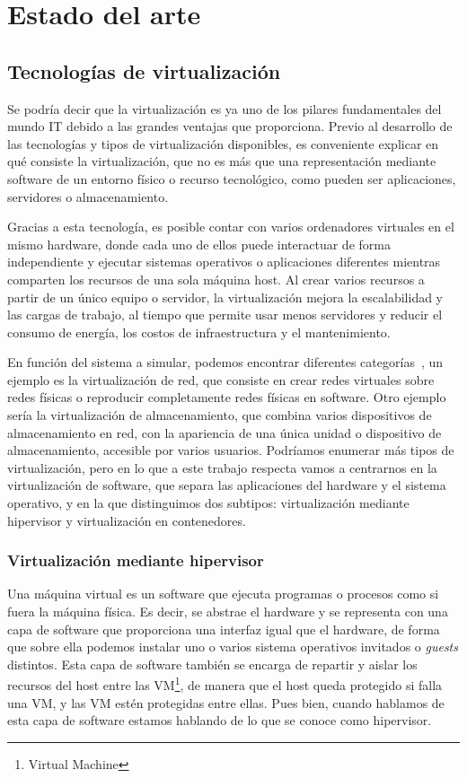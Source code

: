 \chapter{Estado del arte} \label{ch:estado}
\section{Tecnologías de virtualización} \label{sec:virt}
	Se podría decir que la virtualización es ya uno de los pilares fundamentales del mundo IT debido a las grandes ventajas que proporciona. Previo al desarrollo de las tecnologías y tipos de virtualización disponibles, es conveniente explicar en qué consiste la virtualización, que no es más que una representación mediante software de un entorno físico o recurso tecnológico, como pueden ser aplicaciones, servidores o almacenamiento.~\cite{virt1} 

	Gracias a esta tecnología, es posible contar con varios ordenadores virtuales en el mismo hardware, donde cada uno de ellos puede interactuar de forma independiente y ejecutar sistemas operativos o aplicaciones diferentes mientras comparten los recursos de una sola máquina host. Al crear varios recursos a partir de un único equipo o servidor, la virtualización mejora la escalabilidad y las cargas de trabajo, al tiempo que permite usar menos servidores y reducir el consumo de energía, los costos de infraestructura y el mantenimiento.

	En función del sistema a simular, podemos encontrar diferentes categorías~\cite{virt2}, un ejemplo es la virtualización de red, que consiste en crear redes virtuales sobre redes físicas o reproducir completamente redes físicas en software. Otro ejemplo sería la virtualización de almacenamiento, que combina varios dispositivos de almacenamiento en red, con la apariencia de una única unidad o dispositivo de almacenamiento, accesible por varios usuarios. Podríamos enumerar más tipos de virtualización, pero en lo que a este trabajo respecta vamos a centrarnos en la virtualización de software, que separa las aplicaciones del hardware y el sistema operativo, y en la que distinguimos dos subtipos: virtualización mediante hipervisor y virtualización en contenedores.

\subsection{Virtualización mediante hipervisor} \label{sec:hiperv}
	Una máquina virtual es un software que ejecuta programas o procesos como si fuera la máquina física. Es decir, se abstrae el hardware y se representa con una capa de software que proporciona una interfaz igual que el hardware, de forma que sobre ella podemos instalar uno o varios sistema operativos invitados o \textit{guests} distintos. Esta capa de software también se encarga de repartir y aislar los recursos del host entre las VM\footnote{Virtual Machine}, de manera que el host queda protegido si falla una VM, y las VM estén protegidas entre ellas. Pues bien, cuando hablamos de esta capa de software estamos hablando de lo que se conoce como hipervisor. 

